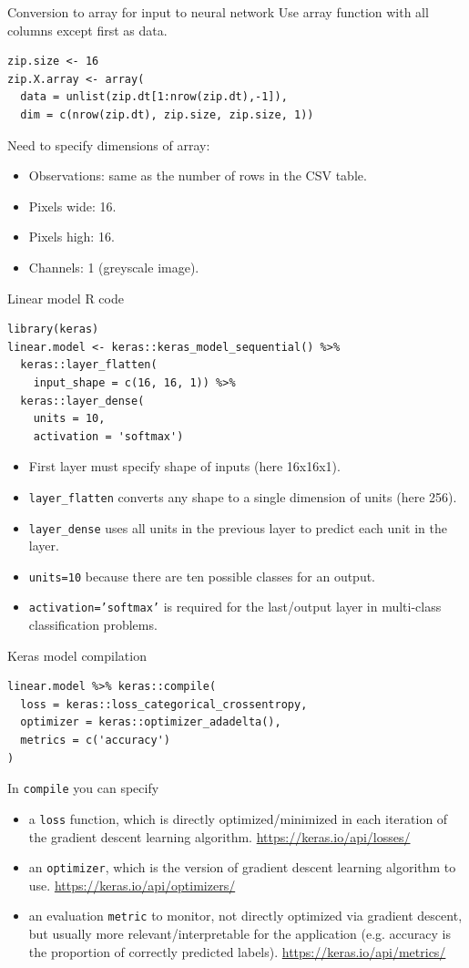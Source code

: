\documentclass[12pt]{article}
\begin{document}
{Conversion to array for input to neural network}
Use array function with all columns except first as data.  
\begin{verbatim}
zip.size <- 16
zip.X.array <- array(
  data = unlist(zip.dt[1:nrow(zip.dt),-1]),
  dim = c(nrow(zip.dt), zip.size, zip.size, 1))
\end{verbatim}
Need to specify dimensions of array:
\begin{itemize}
\item Observations: same as the number of rows in the CSV table.
\item Pixels wide: 16.
\item Pixels high: 16.
\item Channels: 1 (greyscale image).
\end{itemize}

{Linear model R code}
\begin{verbatim}
library(keras)
linear.model <- keras::keras_model_sequential() %>%
  keras::layer_flatten(
    input_shape = c(16, 16, 1)) %>%
  keras::layer_dense(
    units = 10,
    activation = 'softmax')
\end{verbatim}
  \begin{itemize}
  \item First layer must specify shape of inputs (here 16x16x1).
  \item \texttt{layer\_flatten} converts any shape to a single dimension
    of units (here 256).
  \item \texttt{layer\_dense} uses all units in the previous layer to
    predict each unit in the layer.
  \item \texttt{units=10} because there are ten possible classes for an output.
  \item \texttt{activation='softmax'} is required for the last/output layer in
    multi-class classification problems.
\end{itemize}

{Keras model compilation}
\begin{verbatim}
linear.model %>% keras::compile(
  loss = keras::loss_categorical_crossentropy,
  optimizer = keras::optimizer_adadelta(),
  metrics = c('accuracy')
)
\end{verbatim}
In \texttt{compile} you can specify
\begin{itemize}
\item a \texttt{loss} function, which is directly optimized/minimized
  in each iteration of the gradient descent learning algorithm. 
  \url{https://keras.io/api/losses/} 
\item an \texttt{optimizer}, which is the version of gradient descent
  learning algorithm to use. 
  \url{https://keras.io/api/optimizers/} 
\item an evaluation \texttt{metric} to monitor, not directly optimized
  via gradient descent, but usually more relevant/interpretable for
  the application (e.g. accuracy is the proportion of correctly
  predicted labels). \url{https://keras.io/api/metrics/} 
\end{itemize}
 
\end{document}
